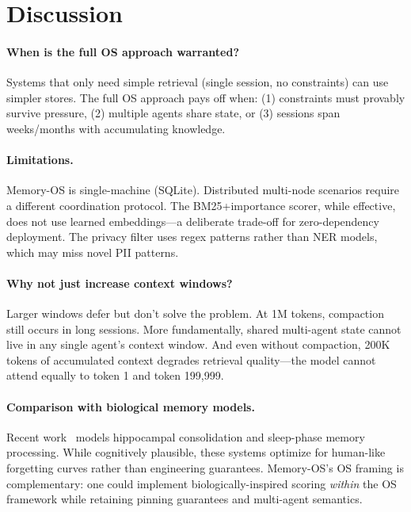 \documentclass[10pt,twocolumn]{article}
\begin{document}
\section{Discussion}
\label{sec:discussion}

\paragraph{When is the full OS approach warranted?} Systems that only need simple retrieval (single session, no constraints) can use simpler stores. The full OS approach pays off when: (1) constraints must provably survive pressure, (2) multiple agents share state, or (3) sessions span weeks/months with accumulating knowledge.

\paragraph{Limitations.} Memory-OS is single-machine (SQLite). Distributed multi-node scenarios require a different coordination protocol. The BM25+importance scorer, while effective, does not use learned embeddings---a deliberate trade-off for zero-dependency deployment. The privacy filter uses regex patterns rather than NER models, which may miss novel PII patterns.

\paragraph{Why not just increase context windows?} Larger windows defer but don't solve the problem. At 1M tokens, compaction still occurs in long sessions. More fundamentally, shared multi-agent state cannot live in any single agent's context window. And even without compaction, 200K tokens of accumulated context degrades retrieval quality---the model cannot attend equally to token 1 and token 199{,}999.

\paragraph{Comparison with biological memory models.} Recent work~\cite{humaninspired2026,episodicsemantic2026} models hippocampal consolidation and sleep-phase memory processing. While cognitively plausible, these systems optimize for human-like forgetting curves rather than engineering guarantees. Memory-OS's OS framing is complementary: one could implement biologically-inspired scoring \emph{within} the OS framework while retaining pinning guarantees and multi-agent semantics.
\end{document}
